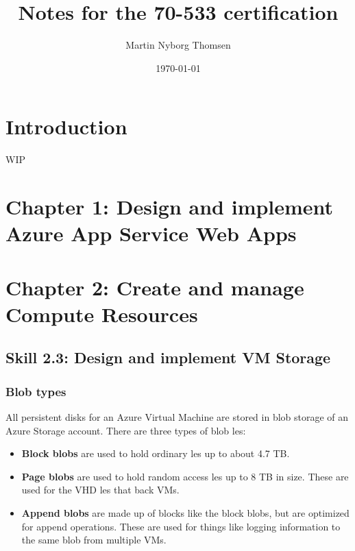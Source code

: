 \documentclass[12pt]{article}
\title{Notes for the 70-533 certification}
\author{Martin Nyborg Thomsen}
\date{\today}
\begin{document}
\maketitle

\section{Introduction}
WIP

\section{Chapter 1: Design and implement Azure App Service Web Apps}

\section{Chapter 2: Create and manage Compute Resources}

\subsection{Skill 2.3: Design and implement VM Storage}

\subsubsection{Blob types}
All persistent disks for an Azure Virtual Machine are stored in blob storage of an Azure Storage account. There are three types of blob  les:
\begin{itemize}
    \item \textbf{Block blobs} are used to hold ordinary  les up to about 4.7 TB.
    \item \textbf{Page blobs} are used to hold random access  les up to 8 TB in size. These are used for the
    VHD  les that back VMs.
    \item \textbf{Append blobs} are made up of blocks like the block blobs, but are optimized for append operations. These are used for things like logging information to the same blob from multiple VMs.
\end{itemize}
\end{document}
